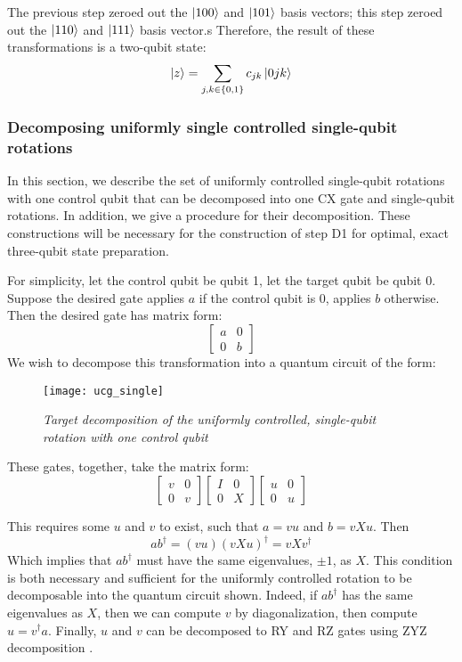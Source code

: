 \documentclass{article}
\begin{document}
The previous step zeroed out the $\mathinner{|{100}\rangle}$ and $\mathinner{|{101}\rangle}$ basis vectors; this
step zeroed out the $\mathinner{|{110}\rangle}$ and $\mathinner{|{111}\rangle}$ basis vector.s Therefore, the
result of these transformations is a two-qubit state:
$$\mathinner{|{z}\rangle} = \sum_{j, k \in \{0, 1\}}{c_{jk}\mathinner{|{0jk}\rangle}}$$

\subsubsection{Decomposing uniformly single controlled single-qubit rotations}
In this section, we describe the set of uniformly controlled single-qubit
rotations with one control qubit that can be decomposed into one CX gate and
single-qubit rotations. In addition, we give a procedure for their 
decomposition. These constructions will be necessary for the construction of
step D1 for optimal, exact three-qubit state preparation.

For simplicity, let the control qubit be qubit 1, let the target qubit be qubit
0. Suppose the desired gate applies $a$ if the control qubit is $0$, applies $b$
otherwise. Then the desired gate has matrix form:
$$\begin{bmatrix}
a&0\\
0&b
\end{bmatrix}$$
We wish to decompose this transformation into a quantum circuit of the form:

\begin{figure}[H]
\centering
\texttt{[image: ucg\_single]}
\caption{\textit{Target decomposition of the uniformly controlled, single-qubit rotation with one control qubit}}
\end{figure}

These gates, together, take the matrix form:
$$\begin{bmatrix}v&0\\0&v\end{bmatrix}
\begin{bmatrix}I&0\\0&X\end{bmatrix}
\begin{bmatrix}u&0\\0&u\end{bmatrix}$$

This requires some $u$ and $v$ to exist, such that $a = vu$ and $b = vXu$. Then
$$ab^\dagger = (vu)(vXu)^\dagger = vXv^\dagger$$
Which implies that $ab^\dagger$ must have the same eigenvalues, $\pm 1$, as $X$.
This condition is both necessary and sufficient for the uniformly controlled
rotation to be decomposable into the quantum circuit shown. Indeed, if 
$ab^\dagger$ has the same eigenvalues as $X$, then we can compute $v$ by 
diagonalization, then compute $u = v^\dagger a$. Finally, $u$ and $v$ can be
decomposed to RY and RZ gates using ZYZ decomposition \cite{1629135}.
\end{document}
